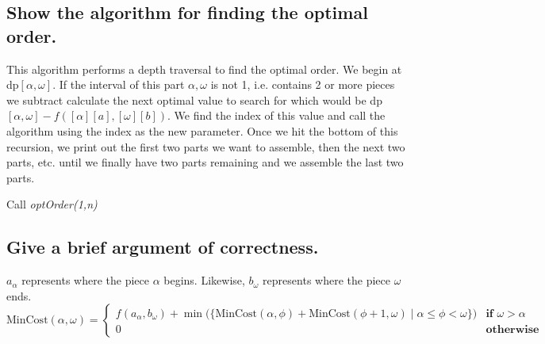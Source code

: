 \documentclass[11pt]{scrartcl}
\begin{document}
\subsection{
	Show the algorithm for finding the optimal order.
}
This algorithm performs a depth traversal to find the optimal order.
We begin at dp$[\alpha, \omega]$. If the interval of this part $\alpha, \omega$
is not 1, i.e. contains 2 or more pieces we subtract calculate the next optimal value to search for
which would be dp$[\alpha, \omega] - f([\alpha][a],[\omega][b])$. We find the index of this value and call
the algorithm using the index as the new parameter. Once we hit the bottom of this recursion, 
we print out the first two parts we want to assemble, then the next two parts, etc. until we finally
have two parts remaining and we assemble the last two parts. 
\begin{algorithm}
\end{algorithm}

Call \textit{optOrder(1,n)}


\subsection{
	Give a brief argument of correctness.
}


$a_\alpha$ represents where the piece $\alpha$ begins.
Likewise, $b_\omega$ represents where the piece $\omega$ ends.
\[
	\text{MinCost}(\alpha,\omega)=
	\begin{cases}
		f(a_\alpha,b_\omega) + \min\Big(
		\Big\{\text{MinCost}(\alpha, \phi) + \text{MinCost}(\phi + 1, \omega) \mid \alpha \leq \phi < \omega\Big\} \Big)
		  & \textbf{if } \omega > \alpha \\
		0 & \textbf{otherwise}
	\end{cases}
\]
\end{document}
